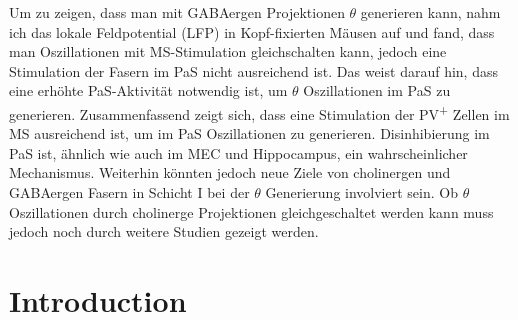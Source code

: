 \documentclass[
  12pt,
  a4paper,
  openany]{book}
\begin{document}
Um zu zeigen, dass man mit GABAergen Projektionen \(\theta\) generieren kann, nahm ich das lokale Feldpotential (LFP) in Kopf-fixierten Mäusen auf und fand, dass man Oszillationen mit MS-Stimulation gleichschalten kann, jedoch eine Stimulation der Fasern im PaS nicht ausreichend ist. Das weist darauf hin, dass eine erhöhte PaS-Aktivität notwendig ist, um \(\theta\) Oszillationen im PaS zu generieren. Zusammenfassend zeigt sich, dass eine Stimulation der PV\textsuperscript{+} Zellen im MS ausreichend ist, um im PaS Oszillationen zu generieren. Disinhibierung im PaS ist, ähnlich wie auch im MEC und Hippocampus, ein wahrscheinlicher Mechanismus. Weiterhin könnten jedoch neue Ziele von cholinergen und GABAergen Fasern in Schicht I bei der \(\theta\) Generierung involviert sein. Ob \(\theta\) Oszillationen durch cholinerge Projektionen gleichgeschaltet werden kann muss jedoch noch durch weitere Studien gezeigt werden.

\mainmatter

\setcounter{tocdepth}{3}
\tableofcontents

\hypertarget{intro}{%
\chapter{Introduction}\label{intro}}
\end{document}
